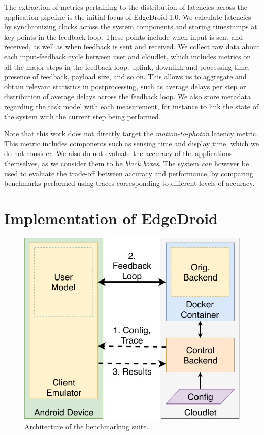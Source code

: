 The extraction of metrics pertaining to the distribution of latencies across the application pipeline is the initial focus of EdgeDroid 1.0.
We calculate latencies by synchronizing clocks across the system components and storing timestamps at key points in the feedback loop.
These points include when input is sent and received, as well as when feedback is sent and received.
We collect raw data about each input-feedback cycle between user and cloudlet, which includes metrics on all the major steps in the feedback loop: uplink, downlink and processing time, presence of feedback, payload size, and so on.
This allows us to aggregate and obtain relevant statistics in postprocessing, such as average delays per step or distribution of average delays across the feedback loop.
We also store metadata regarding the task model with each measurement, for instance to link the state of the system with the current step being performed.

Note that this work does not directly target the \emph{motion-to-photon} latency metric.
This metric includes components such as sensing time and display time, which we do not consider.
We also do not evaluate the accuracy of the applications themselves, as we consider them to be \emph{black boxes}.
The system \emph{can} however be used to evaluate the trade-off between accuracy and performance, by comparing benchmarks performed using traces corresponding to different levels of accuracy.


\section{Implementation of EdgeDroid}\label{paper:olguinmunoz2019edgedroid:sec:implementation}

\begin{figure}[tb]
    \centering
    \includegraphics[width=.7\columnwidth]{publications/2019EdgeDroid/img/TraceReplay_GenArch}
    \caption{Architecture of the benchmarking suite.}\label{paper:olguinmunoz2019edgedroid:fig:TraceReplayArch}
\end{figure}


